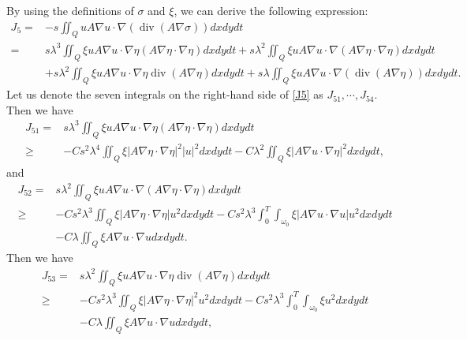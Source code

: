 \documentclass[9pt,reqno]{amsart}
\theoremstyle{plain}
\numberwithin{equation}{section}
\numberwithin{theorem}{section}
\DeclareMathOperator*{\Div}{\mathrm{div}}
\begin{document}
	By using the definitions of $\sigma$ and $\xi$, we can derive the following expression:
	\begin{equation}\label{J5}
		\begin{split}
			J_5  =&-s \iint_Q u A \nabla u \cdot \nabla(\Div(A \nabla \sigma)) dx dy dt\\
			=&s \lambda^3 \iint_Q \xi u A \nabla u \cdot \nabla \eta \left( A \nabla \eta \cdot \nabla \eta\right)  dx dy dt
			+ s \lambda^2 \iint_Q \xi u A \nabla u \cdot \nabla\left(A \nabla \eta \cdot \nabla \eta\right) dx dy dt \\
			& +s \lambda^2 \iint_Q \xi u A \nabla u \cdot \nabla \eta \Div(A \nabla \eta)   dx dy dt+s \lambda \iint_Q \xi u A \nabla u \cdot \nabla(\Div(A \nabla \eta)) dx dy dt.
		\end{split}
	\end{equation}
	Let us denote the seven integrals on the right-hand side of \eqref{J5} as $J_{51}, \cdots, J_{54}$. Then we have
	\begin{equation}\label{J51}
		\begin{split}
			J_{51}=&s \lambda^3 \iint_Q \xi u A \nabla u \cdot \nabla \eta \left( A \nabla \eta \cdot \nabla \eta\right)  dx dy dt\\
			\geq&
			-Cs^2 \lambda^4 \iint_Q \xi\left|A \nabla \eta \cdot \nabla \eta\right|^2|u|^2 dx dy dt
			-C\lambda^2 \iint_Q \xi| A\nabla u \cdot\nabla \eta|^2 dx dy dt,
		\end{split}
	\end{equation}
	and
	\begin{equation}\label{J52}
		\begin{split}
			J_{52}=&s \lambda^2 \iint_Q \xi u A \nabla u \cdot \nabla\left(A \nabla \eta \cdot \nabla \eta\right) dx dy dt\\
			\ge&-Cs^2 \lambda^3\iint_{Q} \xi \left| A \nabla \eta \cdot \nabla \eta \right| u^2 dx dy dt -Cs^2 \lambda^3\int_0^T \int_{\omega_0} \xi \left| A \nabla u \cdot \nabla u \right|  u^2 dx dy dt\\
			&- C\lambda \iint_Q  \xi A \nabla u \cdot \nabla u dx dy dt.
		\end{split}
	\end{equation}
	Then we have
	\begin{equation}\label{J53}
		\begin{split}
			J_{53}=&s \lambda^2 \iint_Q \xi u A \nabla u \cdot \nabla \eta \Div(A \nabla \eta) dx dy dt\\
			\ge& -Cs^2 \lambda^3\iint_Q \xi \left| A \nabla \eta \cdot \nabla \eta \right|^2  u^2  dx dy dt -Cs^2 \lambda^3\int_0^T \int_{\omega_0} \xi u^2 dx dy dt\\
			&- C\lambda \iint_Q \xi A \nabla u \cdot \nabla u dx dy dt,
		\end{split}
	\end{equation}
\end{document}

